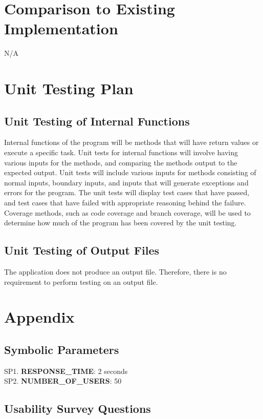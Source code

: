 \documentclass[12pt, titlepage]{article}
\begin{document}
\section{Comparison to Existing Implementation}
N/A

\section{Unit Testing Plan}

\subsection{Unit Testing of Internal Functions}

Internal functions of the program will be methods that will have return values or execute a specific task. Unit tests for internal functions will involve having various inputs for the methods, and comparing the methods output to the expected output. Unit tests will include various inputs for methods consisting of normal inputs, boundary inputs, and inputs that will generate exceptions and errors for the program. The unit tests will display test cases that have passed, and test cases that have failed with appropriate reasoning behind the failure. Coverage methods, such as code coverage and branch coverage, will be used to determine how much of the program has been covered by the unit testing.

\subsection{Unit Testing of Output Files}

The application does not produce an output file. Therefore, there is no requirement to perform testing on an output file.

\section{Appendix}

\subsection{Symbolic Parameters}

SP1. \textbf{RESPONSE\_TIME}: 2 seconds\\
SP2. \textbf{NUMBER\_OF\_USERS}: 50

\subsection{Usability Survey Questions}
\end{document}
